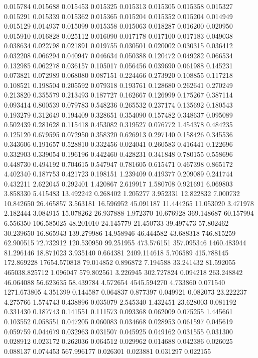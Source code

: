 0.015784
0.015688
0.015453
0.015325
0.015313
0.015305
0.015358
0.015327
0.015291
0.015339
0.015362
0.015365
0.015204
0.015352
0.015204
0.014949
0.015129
0.014937
0.015099
0.015358
0.015063
0.018287
0.016200
0.020950
0.015910
0.016828
0.025112
0.016090
0.017178
0.017100
0.017183
0.049038
0.038634
0.022798
0.021891
0.019755
0.030501
0.020002
0.030315
0.036412
0.032208
0.066294
0.040947
0.046634
0.050388
0.120472
0.049282
0.066534
0.132985
0.062278
0.036157
0.105017
0.056456
0.039690
0.061988
0.145231
0.073821
0.072989
0.068080
0.087151
0.224466
0.273920
0.108855
0.117218
0.108521
0.198504
0.205592
0.079318
0.193761
0.128680
0.262641
0.270249
0.213820
0.355579
0.213493
0.187727
0.162667
0.126999
0.175267
0.387114
0.093414
0.800539
0.079783
0.548236
0.265532
0.237174
0.135692
0.180543
0.193279
0.312649
0.194409
0.328651
0.354090
0.157482
0.348637
0.095089
0.502439
0.281628
0.115418
0.453082
0.319527
0.076772
1.454378
0.484235
0.125120
0.679595
0.072950
0.358320
0.626913
0.297140
0.158426
0.345536
0.343606
0.191657
0.528810
0.332456
0.024041
0.260583
0.416441
0.122696
0.332903
0.339054
0.196196
0.442460
0.428231
0.341848
0.780155
0.558696
0.448730
0.494192
0.704615
0.547947
0.781605
0.615471
0.467398
0.865172
4.402340
0.187753
0.421723
0.198151
1.239409
0.419377
0.209089
0.241744
0.432211
2.622045
0.292401
1.420867
2.619917
1.580708
0.921691
6.069803
3.858330
5.415483
13.492242
0.268402
1.205277
3.952331
12.822832
7.000732
10.842650
26.465857
3.563181
16.596952
45.091187
11.444265
11.053020
3.471978
2.182444
3.084915
15.078262
26.937888
1.972370
10.676928
369.148687
60.157994
6.556350
106.585025
48.201010
24.145779
21.450733
39.497473
57.802462
30.239650
16.865943
139.279986
14.958946
46.444582
43.688318
746.815259
62.900515
72.732912
120.530950
99.251955
473.576151
357.095346
1460.483944
81.296146
18.871023
3.935140
0.664381
2409.114618
5.706589
415.788145
172.869228
17654.570818
79.014852
0.896872
7.194588
33.241432
81.592055
465038.825712
1.096047
579.802561
3.226945
302.727824
0.094218
263.248842
46.064088
56.623635
58.439784
4.572654
4545.594270
4.733860
0.071540
1271.673805
4.351399
0.144587
0.064837
0.877397
0.049921
0.082073
23.222237
4.275766
1.574743
0.438896
0.035079
2.545340
1.432451
23.628003
0.081192
0.331430
0.187743
0.141551
0.111573
0.093368
0.062009
0.075255
1.445661
0.103552
0.058551
0.047205
0.060083
0.034668
0.028953
0.061597
0.045619
0.059759
0.044679
0.032963
0.031507
0.045925
0.049162
0.031555
0.031300
0.028912
0.023172
0.262036
0.064512
0.029962
0.014688
0.042386
0.026025
0.088137
0.074453
567.996177
0.026301
0.023881
0.031297
0.022155

